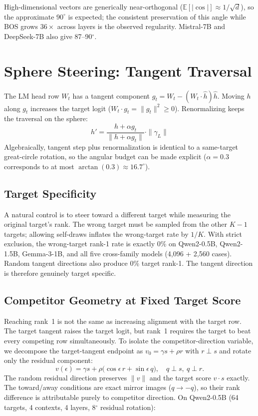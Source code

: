 \documentclass{article}
\begin{document}
High-dimensional vectors are generically near-orthogonal ($\mathbb{E}[|\cos|]
\approx 1/\sqrt{d}$), so the approximate $90^\circ$ is expected; the consistent
preservation of this angle while BOS grows $36\times$ across layers is the
observed regularity. Mistral-7B and DeepSeek-7B also give 87--90$^\circ$.

\section{Sphere Steering: Tangent Traversal}

The LM head row $W_t$ has a tangent component $g_t = W_t - (W_t \cdot
\hat{h})\hat{h}$. Moving $h$ along $g_t$ increases the target logit ($W_t \cdot
g_t = \|g_t\|^2 \geq 0$). Renormalizing keeps the traversal on the sphere:
\[
h' = \frac{h + \alpha g_t}{\|h + \alpha g_t\|} \cdot \|\gamma_L\|
\]
Algebraically, tangent step plus renormalization is identical to a
same-target great-circle rotation, so the angular budget can be made explicit
($\alpha=0.3$ corresponds to at most $\arctan(0.3) \approx 16.7^\circ$).

\subsection{Target Specificity}

A natural control is to steer toward a different target while measuring the
original target's rank. The wrong target must be sampled from the other $K-1$
targets; allowing self-draws inflates the wrong-target rate by $1/K$. With
strict exclusion, the wrong-target rank-1 rate is exactly 0\% on Qwen2-0.5B,
Qwen2-1.5B, Gemma-3-1B, and all five cross-family models (4,096 + 2,560
cases). Random tangent directions also produce 0\% target rank-1. The tangent
direction is therefore genuinely target specific.

\subsection{Competitor Geometry at Fixed Target Score}

Reaching rank~1 is not the same as increasing alignment with the target row.
The target tangent raises the target logit, but rank~1 requires the target to
beat every competing row simultaneously. To isolate the competitor-direction
variable, we decompose the target-tangent endpoint as $v_0 = \gamma s + \rho r$
with $r \perp s$ and rotate only the residual component:
\[
v(\epsilon) = \gamma s + \rho\bigl(\cos\epsilon\, r + \sin\epsilon\, q\bigr),
\quad q \perp s,\ q \perp r.
\]
The random residual direction preserves $\|v\|$ and the target score $v \cdot
s$ exactly. The toward/away conditions are exact mirror images ($q \to -q$), so
their rank difference is attributable purely to competitor direction.
On Qwen2-0.5B (64 targets, 4 contexts, 4 layers, 8$^\circ$
residual rotation):
\end{document}
